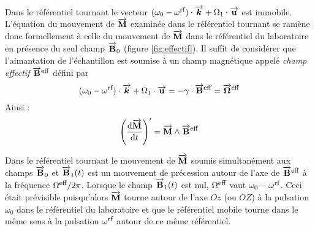 Dans le référentiel tournant le vecteur $(\omega_0-\omrf)\cdot\kvec + \omuns\cdot\uvec$
est immobile. 
L'équation du mouvement de $\aimvec$ examinée dans le référentiel tournant se ramène donc
formellement à celle du mouvement de $\aimvec$ dans le référentiel du laboratoire
en présence du seul champ $\bzerovec$ (figure \ref{fig:effectif}).
Il suffit de considérer que l'aimantation de l'échantillon est soumise à un champ magnétique
appelé \emph{champ effectif} $\bveceff$ défini par 
\begin{equation}
(\omega_0-\omrf)\cdot\kvec + \omuns\cdot\uvec = -\gamma\cdot\bveceff = \omveceff 
\end{equation}
Ainsi :
\begin{equation}
\left(\derivt{\aimvec}\right)' = \aimvec\wedge\bveceff 
\end{equation}

Dans le référentiel tournant le mouvement de $\aimvec$ soumis simultanément aux champs 
$\bzerovec$ et $\bunvect$ est un mouvement de précession autour de l'axe de 
$\bveceff$ à la fréquence $\omeff/2\pi$.
Lorsque le champ $\bunvect$ est nul, $\omeff$ vaut $\omega_0-\omrf$.
Ceci était prévisible puisqu'alors $\aimvec$ tourne autour de l'axe 
$Oz$ (ou $OZ$) à la pulsation $\omega_0$ dans le référentiel du laboratoire
et que le référentiel mobile tourne dans le même sens
à la pulsation $\omrf$ autour de ce même référentiel.
